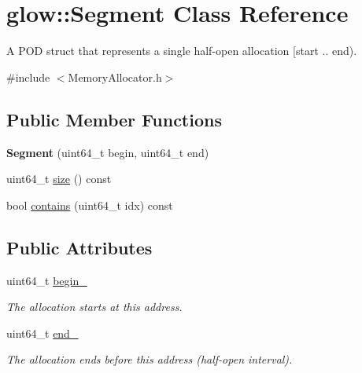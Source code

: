 \hypertarget{classglow_1_1_segment}{}\section{glow\+:\+:Segment Class Reference}
\label{classglow_1_1_segment}


A P\+OD struct that represents a single half-\/open allocation \mbox{[}start .. end).  




{\ttfamily \#include $<$Memory\+Allocator.\+h$>$}

\subsection*{Public Member Functions}
\begin{DoxyCompactItemize}
\item 
\mbox{\label{classglow_1_1_segment_a6ffc406c24418a220df4431d4d6239a6}} 
{\bfseries Segment} (uint64\+\_\+t begin, uint64\+\_\+t end)
\item 
uint64\+\_\+t \hyperlink{classglow_1_1_segment_ae8a61cbc6362e27e4b9e58da5f762f7b}{size} () const
\item 
bool \hyperlink{classglow_1_1_segment_a11d0f8ff343b8691d7f8086b4078868a}{contains} (uint64\+\_\+t idx) const
\end{DoxyCompactItemize}
\subsection*{Public Attributes}
\begin{DoxyCompactItemize}
\item 
\mbox{\label{classglow_1_1_segment_aa11a499a96603a528f150a102f6c7cd9}} 
uint64\+\_\+t \hyperlink{classglow_1_1_segment_aa11a499a96603a528f150a102f6c7cd9}{begin\+\_\+}
\begin{DoxyCompactList}\small\item\em The allocation starts at this address. \end{DoxyCompactList}\item 
\mbox{\label{classglow_1_1_segment_ada84bef372c93043ff0b9e614a688057}} 
uint64\+\_\+t \hyperlink{classglow_1_1_segment_ada84bef372c93043ff0b9e614a688057}{end\+\_\+}
\begin{DoxyCompactList}\small\item\em The allocation ends before this address (half-\/open interval). \end{DoxyCompactList}\end{DoxyCompactItemize}


